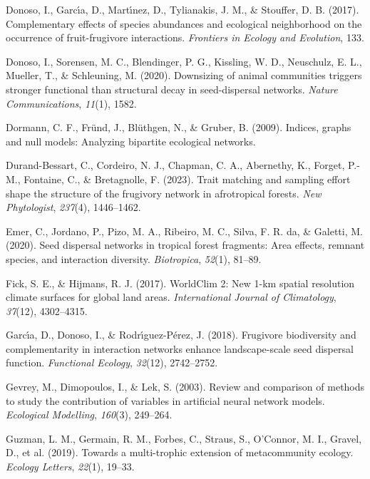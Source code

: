 \documentclass[
]{agujournal2019}
\newlength{\cslhangindent}
\newenvironment{CSLReferences}[2] %
 {\begin{list}{}{%
  \setlength{\itemindent}{0pt}
  \setlength{\leftmargin}{0pt}
  \setlength{\parsep}{0pt}
  \ifodd #1
   \setlength{\leftmargin}{\cslhangindent}
   \setlength{\itemindent}{-1\cslhangindent}
  \fi
  \setlength{\itemsep}{#2\baselineskip}}}
 {\end{list}}
\begin{document}
\begin{CSLReferences}{1}{0}
Donoso, I., Garcı́a, D., Martı́nez, D., Tylianakis, J. M., \& Stouffer, D.
B. (2017). Complementary effects of species abundances and ecological
neighborhood on the occurrence of fruit-frugivore interactions.
\emph{Frontiers in Ecology and Evolution}, 133.

Donoso, I., Sorensen, M. C., Blendinger, P. G., Kissling, W. D.,
Neuschulz, E. L., Mueller, T., \& Schleuning, M. (2020). Downsizing of
animal communities triggers stronger functional than structural decay in
seed-dispersal networks. \emph{Nature Communications}, \emph{11}(1),
1582.

Dormann, C. F., Fründ, J., Blüthgen, N., \& Gruber, B. (2009). Indices,
graphs and null models: Analyzing bipartite ecological networks.

Durand-Bessart, C., Cordeiro, N. J., Chapman, C. A., Abernethy, K.,
Forget, P.-M., Fontaine, C., \& Bretagnolle, F. (2023). Trait matching
and sampling effort shape the structure of the frugivory network in
afrotropical forests. \emph{New Phytologist}, \emph{237}(4), 1446--1462.

Emer, C., Jordano, P., Pizo, M. A., Ribeiro, M. C., Silva, F. R. da, \&
Galetti, M. (2020). Seed dispersal networks in tropical forest
fragments: Area effects, remnant species, and interaction diversity.
\emph{Biotropica}, \emph{52}(1), 81--89.

Fick, S. E., \& Hijmans, R. J. (2017). WorldClim 2: New 1-km spatial
resolution climate surfaces for global land areas. \emph{International
Journal of Climatology}, \emph{37}(12), 4302--4315.

Garcı́a, D., Donoso, I., \& Rodrı́guez-Pérez, J. (2018). Frugivore
biodiversity and complementarity in interaction networks enhance
landscape-scale seed dispersal function. \emph{Functional Ecology},
\emph{32}(12), 2742--2752.

Gevrey, M., Dimopoulos, I., \& Lek, S. (2003). Review and comparison of
methods to study the contribution of variables in artificial neural
network models. \emph{Ecological Modelling}, \emph{160}(3), 249--264.

Guzman, L. M., Germain, R. M., Forbes, C., Straus, S., O'Connor, M. I.,
Gravel, D., et al. (2019). Towards a multi-trophic extension of
metacommunity ecology. \emph{Ecology Letters}, \emph{22}(1), 19--33.


\end{CSLReferences}
\end{document}
